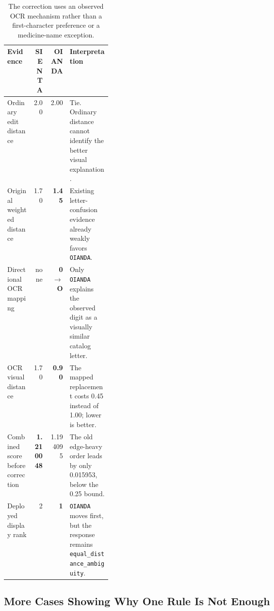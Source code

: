 \documentclass[11pt,a4paper]{article}
\newcommand{\code}[1]{\texttt{#1}}
\begin{document}
\begin{table}[H]
\centering
\small
\begin{tabularx}{\linewidth}{@{}L{0.25\linewidth}rrY@{}}
\toprule
\textbf{Evidence} & \textbf{SIENTA} & \textbf{OIANDA} & \textbf{Interpretation} \\
\midrule
Ordinary edit distance & 2.00 & 2.00 & Tie. Ordinary distance cannot identify the better visual explanation. \\
Original weighted distance & 1.70 & \textbf{1.45} & Existing letter-confusion evidence already weakly favors \code{OIANDA}. \\
Directional OCR mapping & none & \textbf{0$\rightarrow$O} & Only \code{OIANDA} explains the observed digit as a visually similar catalog letter. \\
OCR visual distance & 1.70 & \textbf{0.90} & The mapped replacement costs 0.45 instead of 1.00; lower is better. \\
Combined score before correction & \textbf{1.210048} & 1.194095 & The old edge-heavy order leads by only 0.015953, below the 0.25 bound. \\
Deployed display rank & 2 & \textbf{1} & \code{OIANDA} moves first, but the response remains \code{equal\_distance\_ambiguity}. \\
\bottomrule
\end{tabularx}
\caption{The correction uses an observed OCR mechanism rather than a first-character preference or a medicine-name exception.}
\label{tab:oianta-visual-tie}
\end{table}

\subsection{More Cases Showing Why One Rule Is Not Enough}
\end{document}
